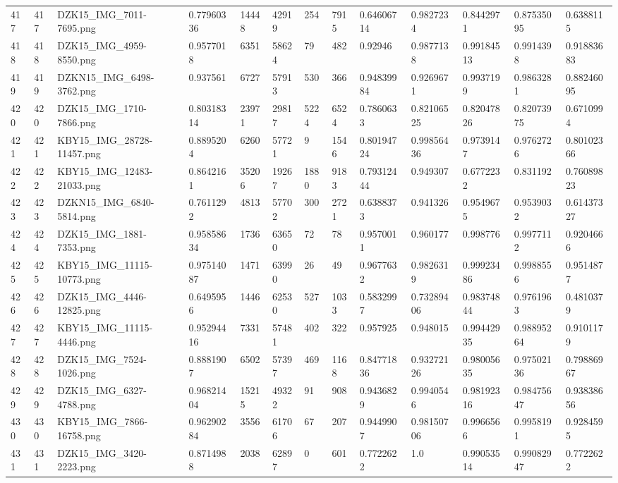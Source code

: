 \documentclass[11pt, a4paper, twoside]{report}
\begin{document}
\begin{longtable}[c]{@{}lllllllllllll@{}}
417 & 417 & DZK15\_IMG\_7011-7695.png & 0.77960336 & 14448 & 42919 & 254 & 7915 & 0.64606714 & 0.9827234 & 0.8442971 & 0.87535095 & 0.6388115 \\
418 & 418 & DZK15\_IMG\_4959-8550.png & 0.9577018 & 6351 & 58624 & 79 & 482 & 0.92946 & 0.9877138 & 0.99184513 & 0.9914398 & 0.91883683 \\
419 & 419 & DZKN15\_IMG\_6498-3762.png & 0.937561 & 6727 & 57913 & 530 & 366 & 0.94839984 & 0.9269671 & 0.9937199 & 0.9863281 & 0.88246095 \\
420 & 420 & DZK15\_IMG\_1710-7866.png & 0.80318314 & 23971 & 29817 & 5224 & 6524 & 0.7860633 & 0.82106525 & 0.82047826 & 0.82073975 & 0.6710994 \\
421 & 421 & KBY15\_IMG\_28728-11457.png & 0.8895204 & 6260 & 57721 & 9 & 1546 & 0.80194724 & 0.99856436 & 0.9739147 & 0.9762726 & 0.80102366 \\
422 & 422 & KBY15\_IMG\_12483-21033.png & 0.8642161 & 35206 & 19267 & 1880 & 9183 & 0.79312444 & 0.949307 & 0.6772232 & 0.831192 & 0.76089823 \\
423 & 423 & DZKN15\_IMG\_6840-5814.png & 0.7611292 & 4813 & 57702 & 300 & 2721 & 0.6388373 & 0.941326 & 0.9549675 & 0.9539032 & 0.61437327 \\
424 & 424 & DZK15\_IMG\_1881-7353.png & 0.95858634 & 1736 & 63650 & 72 & 78 & 0.9570011 & 0.960177 & 0.998776 & 0.9977112 & 0.9204666 \\
425 & 425 & KBY15\_IMG\_11115-10773.png & 0.97514087 & 1471 & 63990 & 26 & 49 & 0.9677632 & 0.9826319 & 0.99923486 & 0.9988556 & 0.9514877 \\
426 & 426 & DZK15\_IMG\_4446-12825.png & 0.6495956 & 1446 & 62530 & 527 & 1033 & 0.5832997 & 0.73289406 & 0.98374844 & 0.9761963 & 0.4810379 \\
427 & 427 & KBY15\_IMG\_11115-4446.png & 0.95294416 & 7331 & 57481 & 402 & 322 & 0.957925 & 0.948015 & 0.99442935 & 0.98895264 & 0.9101179 \\
428 & 428 & DZK15\_IMG\_7524-1026.png & 0.8881907 & 6502 & 57397 & 469 & 1168 & 0.84771836 & 0.93272126 & 0.98005635 & 0.97502136 & 0.79886967 \\
429 & 429 & DZK15\_IMG\_6327-4788.png & 0.96821404 & 15215 & 49322 & 91 & 908 & 0.9436829 & 0.9940546 & 0.98192316 & 0.98475647 & 0.93838656 \\
430 & 430 & KBY15\_IMG\_7866-16758.png & 0.96290284 & 3556 & 61706 & 67 & 207 & 0.9449907 & 0.98150706 & 0.9966566 & 0.9958191 & 0.9284595 \\
431 & 431 & DZK15\_IMG\_3420-2223.png & 0.8714988 & 2038 & 62897 & 0 & 601 & 0.7722622 & 1.0 & 0.99053514 & 0.99082947 & 0.7722622 \\

\end{longtable}
\end{document}
